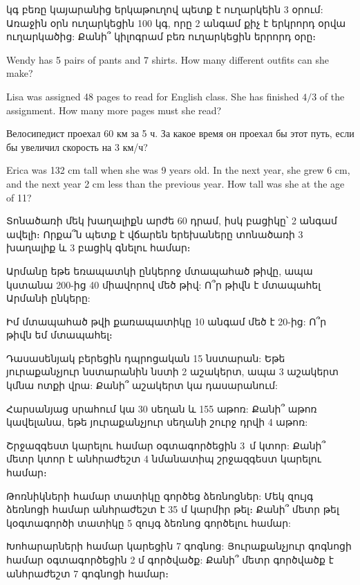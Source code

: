  կգ բեռը կայարանից երկաթուղով պետք է 
ուղարկեին 3 օրում: Առաջին օրն ուղարկեցին 100 կգ, որը 
2 անգամ քիչ է երկրորդ օրվա ուղարկածից: Քանի՞ կիլոգրամ 
բեռ ուղարկեցին երրորդ օրը։

\textproblem Wendy has 5 pairs of pants and 7 
shirts. How many different outfits can she make?

\textproblem Lisa was assigned 48 pages to read 
for English class. She has finished $4/3$ of
the assignment. How many more pages must she read?

\textproblem Велосипедист проехал 60 км за 5 ч. За 
какое время он проехал бы этот путь, если бы увеличил
скорость на 3 км/ч?


\textproblem Erica was 132 cm tall when she was 9 years 
old. In the next year, she grew 6 cm, and the next year 
2 cm less than the previous year. How tall was she at 
the age of 11?








\bye


\problem
Տոնածառի մեկ խաղալիքն արժե 60 դրամ, իսկ բացիկը՝ 2 
անգամ ավելի։ Որքա՞ն պետք է վճարեն երեխաները տոնածառի 
3 խաղալիք և 3 բացիկ գնելու համար։

\problem
Արմանը եթե եռապատկի ընկերոջ մտապահած թիվը, ապա կստանա 
200-ից 40 միավորով մեծ թիվ: Ո՞ր թիվն է մտապահել Արմանի 
ընկերը:

\problem
Իմ մտապահած թվի քառապատիկը 10 անգամ մեծ է 20-ից: Ո՞ր 
թիվն եմ մտապահել։

\problem
Դասասենյակ բերեցին դպրոցական 15 նստարան: Եթե յուրաքանչյուր 
նստարանին նստի 2 աշակերտ, ապա 3 աշակերտ կմնա ոտքի վրա: 
Քանի՞ աշակերտ կա դասարանում:

\problem
Հարսանյաց սրահում կա 30 սեղան և 155 աթոռ: Քանի՞ աթոռ 
կավելանա, եթե յուրաքանչյուր սեղանի շուրջ դրվի 4 աթոռ:


\problem
Շրջազգեստ կարելու համար օգտագործեցին 3~մ կտոր: Քանի՞ 
մետր կտոր է անհրաժեշտ 4 նմանատիպ շրջազգեստ կարելու համար։

\problem
Թոռնիկների համար տատիկը գործեց ձեռնոցներ: Մեկ զույգ 
ձեռնոցի համար անհրաժեշտ է 35 մ կարմիր թել։ Քանի՞ մետր 
թել կօգտագործի տատիկը 5 զույգ ձեռնոց գործելու համար:

\problem
Խոհարարների համար կարեցին 7 գոգնոց: Յուրաքանչյուր 
գոգնոցի համար օգտագործեցին 2 մ գործվածք: Քանի՞ մետր 
գործվածք է անհրաժեշտ 7 գոգնոցի համար։

